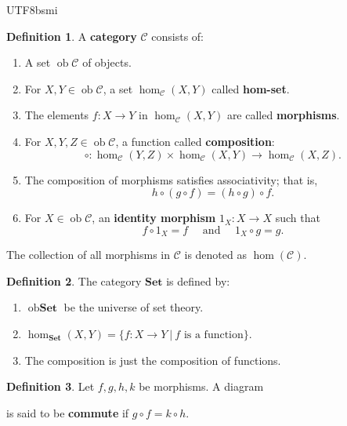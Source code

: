 \documentclass[12pt]{article}
\theoremstyle{definition}
\newtheorem{definition}{Definition}[section]
\newcommand\<{\langle}
\renewcommand\>{\rangle}
\DeclareMathOperator{\ob}{ob}
\begin{document}
\begin{CJK}{UTF8}{bsmi}
\begin{definition}
    A \textbf{category} $\mathcal{C}$ consists of:
    \begin{enumerate}
        \item A set $\ob\mathcal{C}$ of objects.
        \item For $X, Y\in\ob\mathcal{C}$, a set $\hom_\mathcal{C}(X, Y)$ called \textbf{hom-set}.
        \item[] The elements $f:X\to Y$ in $\hom_\mathcal{C}(X, Y)$ are called \textbf{morphisms}. 
        \item For $X, Y, Z\in\ob\mathcal{C}$, a function called \textbf{composition}:
        \[
            \circ: \hom_\mathcal{C}(Y, Z)\times\hom_\mathcal{C}(X, Y)\to\hom_\mathcal{C}(X, Z).
        \]
        \item The composition of morphisms satisfies associativity; that is, $$h\circ(g\circ f)=(h\circ g)\circ f.$$
        \item For $X\in\ob\mathcal{C}$, an \textbf{identity morphism} $1_X:X\to X$ such that
        \[
            f\circ 1_X=f
            \quad\text{ and }\quad
            1_X\circ g=g.
        \]
    \end{enumerate}
\end{definition}

The collection of all morphisms in $\mathcal{C}$ is denoted as $\hom(\mathcal{C})$.

\begin{definition}
    The category $\textbf{Set}$ is defined by:
    \begin{enumerate}
        \item $\ob\textbf{Set}$ be the universe of set theory.
        \item $\hom_\textbf{Set}(X, Y)=\{f:X\to Y\ |\ f\text{ is a function}\}$.
        \item The composition is just the composition of functions.
    \end{enumerate}
\end{definition}

\begin{definition}
    Let $f, g, h, k$ be morphisms.
    A diagram
    \begin{center}
    \end{center}
    is said to be \textbf{commute} if $g\circ f=k\circ h$.
\end{definition}


\end{CJK}
\end{document}
